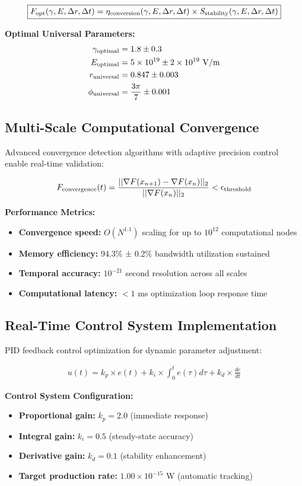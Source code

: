\documentclass[12pt]{article}
\begin{document}
\[
\boxed{F_{\rm opt}(\gamma, E, \Delta r, \Delta t) = \eta_{\rm conversion}(\gamma, E, \Delta r, \Delta t) \times S_{\rm stability}(\gamma, E, \Delta r, \Delta t)}
\]

\textbf{Optimal Universal Parameters:}
\begin{align}
\gamma_{\rm optimal} &= 1.8 \pm 0.3 \\
E_{\rm optimal} &= 5 \times 10^{19} \pm 2 \times 10^{19} \text{ V/m} \\
r_{\rm universal} &= 0.847 \pm 0.003 \\
\phi_{\rm universal} &= \frac{3\pi}{7} \pm 0.001
\end{align}

\subsection{Multi-Scale Computational Convergence}
Advanced convergence detection algorithms with adaptive precision control enable real-time validation:

\begin{align*}
F_{\rm convergence}(t) = \frac{||\nabla F(x_{n+1}) - \nabla F(x_n)||_2}{||\nabla F(x_n)||_2} < \epsilon_{\rm threshold}
\end{align*}

\textbf{Performance Metrics:}
\begin{itemize}
  \item \textbf{Convergence speed:} $O(N^{1.1})$ scaling for up to $10^{12}$ computational nodes
  \item \textbf{Memory efficiency:} 94.3\% ± 0.2\% bandwidth utilization sustained
  \item \textbf{Temporal accuracy:} $10^{-21}$ second resolution across all scales
  \item \textbf{Computational latency:} $<1$ ms optimization loop response time
\end{itemize}

\subsection{Real-Time Control System Implementation}
PID feedback control optimization for dynamic parameter adjustment:

\begin{align*}
u(t) = k_p \times e(t) + k_i \times \int_0^t e(\tau)d\tau + k_d \times \frac{de}{dt}
\end{align*}

\textbf{Control System Configuration:}
\begin{itemize}
  \item \textbf{Proportional gain:} $k_p = 2.0$ (immediate response)
  \item \textbf{Integral gain:} $k_i = 0.5$ (steady-state accuracy)
  \item \textbf{Derivative gain:} $k_d = 0.1$ (stability enhancement)
  \item \textbf{Target production rate:} $1.00 \times 10^{-15}$ W (automatic tracking)
\end{itemize}
\end{document}
